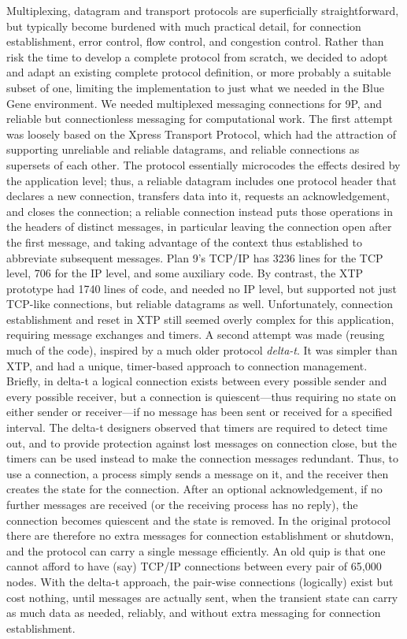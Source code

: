 Multiplexing, datagram and transport protocols are superficially
straightforward, but typically become burdened with much practical
detail, for connection establishment, error control, flow control, and
congestion control. \cite{John-Day-Patterns-of-Network-Archictures}
Rather than risk the time to develop a complete protocol from scratch,
we decided to adopt and adapt an existing complete protocol
definition, or more probably a suitable subset of one, limiting the
implementation to just what we needed in the Blue Gene environment.
We needed multiplexed messaging connections for 9P, and reliable but
connectionless messaging for computational work.  The first attempt
was loosely based on the Xpress Transport Protocol,\cite{xtp} which
had the attraction of supporting unreliable and reliable datagrams,
and reliable connections as supersets of each other.  The protocol
essentially microcodes the effects desired by the application level;
thus, a reliable datagram includes one protocol header that declares a
new connection, transfers data into it, requests an acknowledgement,
and closes the connection; a reliable connection instead puts those
operations in the headers of distinct messages, in particular leaving
the connection open after the first message, and taking advantage of
the context thus established to abbreviate subsequent messages.  Plan
9's TCP/IP has 3236 lines for the TCP level, 706 for the IP level, and
some auxiliary code.  By contrast, the XTP prototype had 1740 lines of
code, and needed no IP level, but supported not just TCP-like
connections, but reliable datagrams as well.  Unfortunately,
connection establishment and reset in XTP still seemed overly complex
for this application, requiring message exchanges and timers.  A
second attempt was made (reusing much of the code), inspired by a much
older protocol \emph{delta-t}.\cite{delta-t} It was simpler than XTP,
and had a unique, timer-based approach to connection management.
Briefly, in delta-t a logical connection exists between every possible
sender and every possible receiver, but a connection is
quiescent---thus requiring no state on either sender or receiver---if
no message has been sent or received for a specified interval.  The
delta-t designers observed that timers are required to detect time
out, and to provide protection against lost messages on connection
close, but the timers can be used instead to make the connection
messages redundant.  Thus, to use a connection, a process simply sends
a message on it, and the receiver then creates the state for the
connection. After an optional acknowledgement, if no further messages
are received (or the receiving process has no reply), the connection
becomes quiescent and the state is removed. In the original protocol
there are therefore no extra messages for connection establishment or
shutdown, and the protocol can carry a single message efficiently.  An
old quip is that one cannot afford to have (say) TCP/IP connections
between every pair of 65,000 nodes.  With the delta-t approach, the
pair-wise connections (logically) exist but cost nothing, until
messages are actually sent, when the transient state can carry as much
data as needed, reliably, and without extra messaging for connection
establishment.

